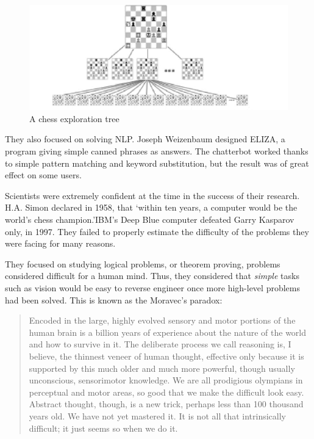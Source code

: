 \documentclass[12pt]{article}
\begin{document}
\begin{figure}[ht]
    \centering
    \includegraphics[width=\textwidth]{chess-tree}
    \caption{A chess exploration tree}
    \label{fig:chess_tree}
\end{figure}

\smallskip

They also focused on solving \gls{NLP}. Joseph Weizenbaum designed ELIZA, a
program giving simple canned phrases as answers. The chatterbot worked thanks to
simple  pattern matching and keyword substitution, but the result was of great
effect on some users.

Scientists were extremely confident at the time in the success of their research.
H.A. Simon declared in 1958, that \lq within ten years, a computer would be the
world's chess champion.\rq IBM's Deep Blue computer defeated Garry Kasparov only,
in 1997. They failed to properly estimate the difficulty of the problems they were
facing for many reasons.

They focused on studying logical problems, or theorem proving, problems considered
difficult for a human mind. Thus, they considered that {\em simple} tasks such as
vision would be easy to reverse engineer once more high-level problems had been
solved. This is known as the Moravec's paradox:

\begin{quotation}
  Encoded in the large, highly evolved sensory and motor portions of the human
  brain is a billion years of experience about the nature of the world and how
  to survive in it. The deliberate process we call reasoning is, I believe, the
  thinnest veneer of human thought, effective only because it is supported by
  this much older and much more powerful, though usually unconscious,
  sensorimotor knowledge. We are all prodigious olympians in perceptual and
  motor areas, so good that we make the difficult look easy. Abstract thought,
  though, is a new trick, perhaps less than 100 thousand years old. We have not
  yet mastered it. It is not all that intrinsically difficult; it just seems so
  when we do it. \cite{Moravec}
\end{quotation}
\end{document}
